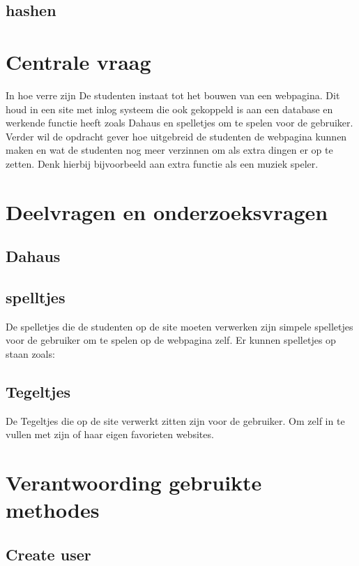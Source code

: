 \documentclass[11pt]{article}
\begin{document}
	\subsection{hashen}
	
	
	\newpage
	
	\section{Centrale vraag}
	In hoe verre zijn De studenten instaat tot het bouwen van een webpagina. Dit houd in een site met inlog systeem die ook gekoppeld is aan een database en werkende functie heeft zoals Dahaus en spelletjes om te spelen voor de gebruiker. Verder wil de opdracht gever hoe uitgebreid de studenten de webpagina kunnen maken en wat de studenten nog meer verzinnen om als extra dingen er op te zetten. Denk hierbij bijvoorbeeld aan extra functie als een muziek speler. 
	
	\newpage
	
	\section{Deelvragen en onderzoeksvragen}
	\subsection{Dahaus}
	\subsection{spelltjes}
	De spelletjes die de studenten op de site moeten verwerken zijn simpele spelletjes voor de gebruiker om te spelen op de webpagina zelf. Er kunnen spelletjes op staan zoals: 
	\subsection{Tegeltjes}
	De Tegeltjes die op de site verwerkt zitten zijn voor de gebruiker. Om zelf in te vullen met zijn of haar eigen favorieten websites.
	\newpage
	
	\section{Verantwoording gebruikte methodes}
	\subsection{Create user}
	
\end{document}
